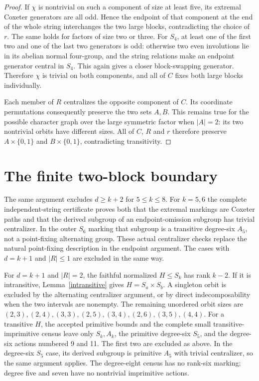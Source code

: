 \begin{proof}
If $\chi$ is nontrivial on such a component of size at least five,
its extremal Coxeter generators are all odd. Hence the endpoint of
that component at the end of the whole string interchanges the two
large blocks, contradicting the choice of $r$. The same holds for
factors of size two or three. For $S_4$, at least one of the first
two and one of the last two generators is odd: otherwise two even
involutions lie in its abelian normal four-group, and the string
relations make an endpoint generator central in $S_4$.
This again gives a closer block-swapping generator. Therefore
$\chi$ is trivial on both components, and all of $C$ fixes both
large blocks individually.

Each member of $R$ centralizes the opposite component of $C$.
Its coordinate permutations consequently preserve the two sets
$A,B$. This remains true for the possible character graph over the
large symmetric factor when $|A|=2$: its two nontrivial orbits have
different sizes. All of $C$, $R$ and $r$ therefore preserve
$A\times\{0,1\}$ and $B\times\{0,1\}$, contradicting transitivity.
\end{proof}

\section{The finite two-block boundary}
The same argument excludes $d\geq k+2$ for $5\leq k\leq8$.
For $k=5,6$ the complete independent-string certificate proves both
that the extremal markings are Coxeter paths and that the derived
subgroup of an endpoint-omission subgroup has trivial centralizer.
In the outer $S_6$ marking that subgroup is a transitive degree-six
$A_5$, not a point-fixing alternating group. These actual centralizer
checks replace the natural point-fixing description in the endpoint
argument. The cases with $d=k+1$ and $|R|\leq1$ are excluded in the
same way.

For $d=k+1$ and $|R|=2$, the faithful normalized $H\leq S_k$ has
rank $k-2$. If it is intransitive, Lemma~\ref{intransitive} gives
$H=S_a\times S_b$. A singleton orbit is excluded by the alternating
centralizer argument, or by direct indecomposability when the two
intervals are nonempty. The remaining unordered orbit sizes are
$(2,3),(2,4),(3,3),(2,5),(3,4),(2,6),(3,5),(4,4)$.
For a transitive $H$, the accepted primitive bounds and the complete
small transitive-imprimitive census leave only $S_k,A_k$, the
primitive degree-six $S_5$, and the degree-six actions numbered
9 and 11. The first two are excluded as above. In the degree-six
$S_5$ case, its derived subgroup is primitive $A_5$ with trivial
centralizer, so the same argument applies. The degree-eight census
has no rank-six marking; degree five and seven have no nontrivial
imprimitive actions.

